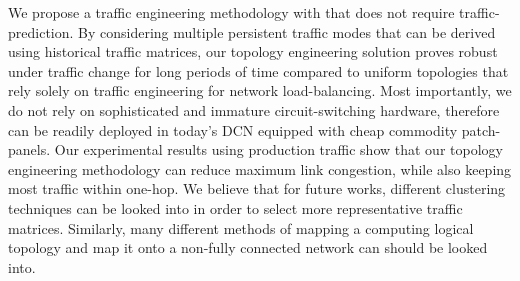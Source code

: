 \documentclass[sigconf]{acmart}
\theoremstyle{definition}
\begin{document}
We propose a traffic engineering methodology with that does not require traffic-prediction. By considering multiple persistent traffic modes that can be derived using historical traffic matrices, our topology engineering solution proves robust under traffic change for long periods of time compared to uniform topologies that rely solely on traffic engineering for network load-balancing. Most importantly, we do not rely on sophisticated and immature circuit-switching hardware, therefore can be readily deployed in today's DCN equipped with cheap commodity patch-panels. Our experimental results using production traffic show that our topology engineering methodology can reduce maximum link congestion, while also keeping most traffic within one-hop. We believe that for future works, different clustering techniques can be looked into in order to select more representative traffic matrices. Similarly, many different methods of mapping a computing logical topology and map it onto a non-fully connected network can should be looked into.
\end{document}

